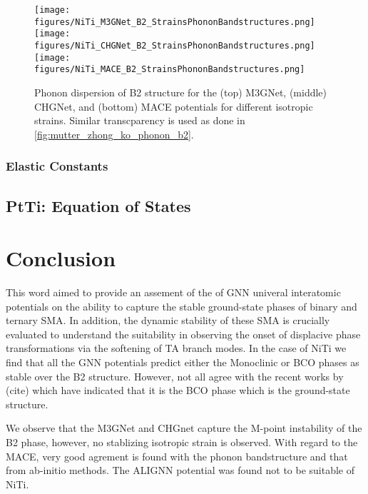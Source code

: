 \documentclass[preprint,colorlinks=true,linkcolor=black,citecolor=black]{elsarticle}
\begin{document}
\begin{figure}[!htp]
	\begin{centering}
		\texttt{[image: figures/NiTi\_M3GNet\_B2\_StrainsPhononBandstructures.png]} \vspace{1mm}
		\texttt{[image: figures/NiTi\_CHGNet\_B2\_StrainsPhononBandstructures.png]} \vspace{1mm}
		\texttt{[image: figures/NiTi\_MACE\_B2\_StrainsPhononBandstructures.png]}
		\caption{ Phonon dispersion of B2 structure for the (top) M3GNet,
			(middle) CHGNet, and (bottom) MACE potentials for different
			isotropic strains. Similar transcparency is used as done in
			\ref{fig:mutter_zhong_ko_phonon_b2}.  }
		\label{fig:gnn_phonon_b2}
	\end{centering}
\end{figure}


\subsubsection{Elastic Constants}


\subsection{PtTi: Equation of States}
\label{sec:ptti_eos}

\section{Conclusion}
\label{sec:conclusion}
This word aimed to provide an assement of the of GNN univeral
interatomic potentials on the ability to capture the stable
ground-state phases of binary and ternary SMA. In addition, the
dynamic stability of these SMA is crucially evaluated to understand
the suitability in observing the onset of displacive phase
transformations via the softening of TA branch modes. In the case of
NiTi we find that all the GNN potentials predict either the Monoclinic
or BCO phases as stable over the B2 structure. However, not all agree
with the recent works by (cite) which have indicated that it is the
BCO phase which is the ground-state structure.

We observe that the M3GNet and CHGnet capture the M-point instability
of the B2 phase, however, no stablizing isotropic strain is
observed. With regard to the MACE, very good agrement is found with
the phonon bandstructure and that from ab-initio methods. The ALIGNN
potential was found not to be suitable of NiTi.
\end{document}
